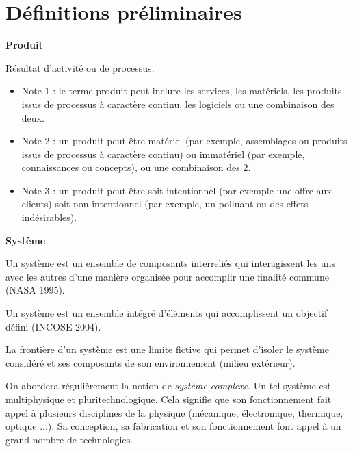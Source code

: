 \documentclass[11pt,oneside]{article}
\begin{document}
\section{Définitions préliminaires}
\begin{defi}

\textbf{Produit} \cite{norme}

Résultat d'activité ou de processus.

\end{defi}
\begin{rem}
\begin{itemize}
\item Note 1 : le terme produit peut inclure les services, les matériels, les produits issus de processus à caractère continu, les logiciels ou une combinaison des deux.
\item Note 2 : un produit peut être matériel (par exemple, assemblages ou produits issus de processus à caractère continu) ou immatériel (par exemple, connaissances ou concepts), ou une combinaison des 2. 
\item Note 3 : un produit peut être soit intentionnel (par exemple une offre aux clients) soit non intentionnel (par exemple, un polluant ou des effets indésirables). 
\end{itemize}
\end{rem}



\begin{defi}
\textbf{Système}\cite{roques}\cite{debout}

Un système est un ensemble de composants interreliés qui interagissent les uns avec les autres d’une manière organisée pour accomplir une finalité commune (NASA 1995).

Un système est un ensemble intégré d’éléments qui accomplissent un objectif défini (INCOSE 2004)\footnotemark[1].

La frontière d’un système est une limite fictive qui permet d'isoler le système considéré et ses composants de son environnement (milieu extérieur).


\end{defi}

\begin{rem}
On abordera régulièrement la notion de \textit{système complexe}. Un tel système est multiphysique et pluritechnologique. Cela signifie que son fonctionnement fait appel à plusieurs disciplines de la physique (mécanique, électronique, thermique, optique ...). Sa conception, sa fabrication et son fonctionnement font appel à un grand nombre de technologies. 
\end{rem}
\end{document}
